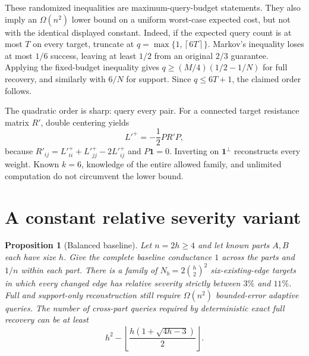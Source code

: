 \documentclass[11pt,letterpaper]{article}
\newtheorem{proposition}[theorem]{Proposition}
\newcommand{\one}{\mathbf 1}
\newcommand{\ceil}[1]{\left\lceil #1\right\rceil}
\newcommand{\floor}[1]{\left\lfloor #1\right\rfloor}
\begin{document}
These randomized inequalities are maximum-query-budget statements. They also imply an $\Omega(n^2)$ lower bound on a uniform worst-case expected cost, but not with the identical displayed constant. Indeed, if the expected query count is at most $T$ on every target, truncate at $q=\max\{1,\ceil{6T}\}$. Markov's inequality loses at most $1/6$ success, leaving at least $1/2$ from an original $2/3$ guarantee. Applying the fixed-budget inequality gives $q\ge(M/4)(1/2-1/N)$ for full recovery, and similarly with $6/N$ for support. Since $q\le6T+1$, the claimed order follows.

The quadratic order is sharp: query every pair. For a connected target resistance matrix $R'$, double centering yields
\[
 L'^+=-\frac12PR'P,
\]
because $R'_{ij}=L'^+_{ii}+L'^+_{jj}-2L'^+_{ij}$ and $P\one=0$. Inverting on $\one^\perp$ reconstructs every weight. Known $k=6$, knowledge of the entire allowed family, and unlimited computation do not circumvent the lower bound.

\section{A constant relative severity variant}
\begin{proposition}[Balanced baseline]\label{prop:balanced}
Let $n=2h\ge4$ and let known parts $A,B$ each have size $h$. Give the complete baseline conductance $1$ across the parts and $1/n$ within each part. There is a family of $N_b=2\binom h2^2$ six-existing-edge targets in which every changed edge has relative severity strictly between $3\%$ and $11\%$. Full and support-only reconstruction still require $\Omega(n^2)$ bounded-error adaptive queries. The number of cross-part queries required by deterministic exact full recovery can be at least
\[
 h^2-\floor{\frac{h(1+\sqrt{4h-3})}{2}}.
\]
\end{proposition}
\end{document}
